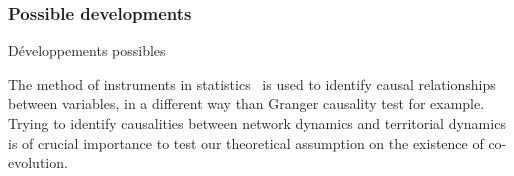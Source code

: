 \subsubsection{Possible developments}{Développements possibles}


The method of instruments in statistics~\cite{angrist1996identification} is used to identify causal relationships between variables, in a different way than Granger causality test for example. Trying to identify causalities between network dynamics and territorial dynamics is of crucial importance to test our theoretical assumption on the existence of co-evolution.
















